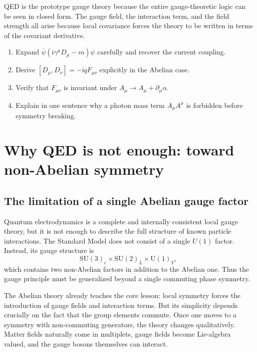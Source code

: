 \documentclass[11pt,a4paper]{article}
\newcommand{\ii}{\mathrm{i}}
\newcommand{\p}{\partial}
\newcommand{\gmu}{\gamma^\mu}
\newcommand{\SMgauge}{\mathrm{SU}(3)_c \times \mathrm{SU}(2)_L \times \mathrm{U}(1)_Y}
\newcommand{\psibar}{\overline{\psi}}
\begin{document}
\begin{takehomebox}
\vspace{0.25cm}
QED is the prototype gauge theory because the entire gauge-theoretic logic can be seen in closed form. The gauge field, the interaction term, and the field strength all arise because local covariance forces the theory to be written in terms of the covariant derivative.
\end{takehomebox}

\begin{guidedchecksbox}
\vspace{0.25cm}
\begin{enumerate}[leftmargin=1.6em,label=\arabic*.]
    \item Expand \(\psibar(\ii\gmu D_\mu-m)\psi\) carefully and recover the current coupling.
    \item Derive \([D_\mu,D_\nu]=-\ii qF_{\mu\nu}\) explicitly in the Abelian case.
    \item Verify that \(F_{\mu\nu}\) is invariant under \(A_\mu\to A_\mu+\p_\mu\alpha\).
    \item Explain in one sentence why a photon mass term \(A_\mu A^\mu\) is forbidden before symmetry breaking.
\end{enumerate}
\end{guidedchecksbox}




\section{Why QED is not enough: toward non-Abelian symmetry}


\subsection{The limitation of a single Abelian gauge factor}

Quantum electrodynamics is a complete and internally consistent local gauge theory, but it is not enough to describe the full structure of known particle interactions. The Standard Model does not consist of a single \(U(1)\) factor. Instead, its gauge structure is
{\color{red}\[
\SMgauge,
\]}
which contains two non-Abelian factors in addition to the Abelian one. Thus the gauge principle must be generalized beyond a single commuting phase symmetry.

The Abelian theory already teaches the core lesson: local symmetry forces the introduction of gauge fields and interaction terms. But its simplicity depends crucially on the fact that the group elements commute. Once one moves to a symmetry with non-commuting generators, the theory changes qualitatively. Matter fields naturally come in multiplets, gauge fields become Lie-algebra valued, and the gauge bosons themselves can interact.
\end{document}
